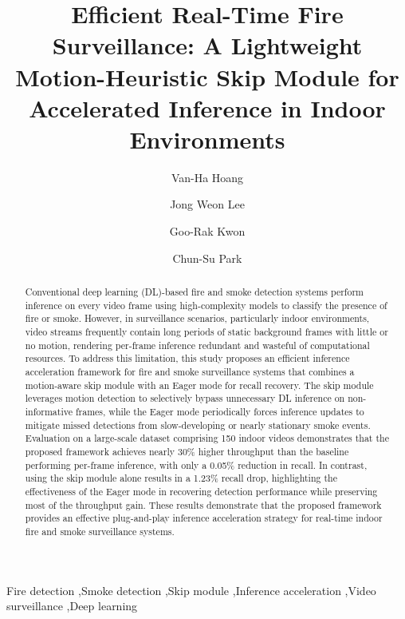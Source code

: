 \documentclass[final,3p,times,twocolumn]{elsarticle}
\begin{document}
\begin{frontmatter}

\title{Efficient Real-Time Fire Surveillance: A Lightweight
Motion-Heuristic Skip Module for Accelerated Inference in Indoor
Environments}

\author[1]{Van-Ha Hoang}

\author[1]{Jong Weon Lee}

\author[2]{Goo-Rak Kwon}

\author[3]{Chun-Su Park}

\address[1]{Department of Software, Sejong University, Seoul, 05006, South Korea}
\address[2]{Department of Information and Communication Engineering, Chosun University, Gwangju, 61452, South Korea}
\address[3]{Department of Computer Education, Sungkyunkwan University, Seoul, 03063, South Korea}


\begin{abstract}
Conventional deep learning (DL)-based fire and smoke detection systems
perform inference on every video frame using high-complexity models to
classify the presence of fire or smoke. However, in surveillance
scenarios, particularly indoor environments, video streams frequently
contain long periods of static background frames with little or no
motion, rendering per-frame inference redundant and wasteful of
computational resources. To address this limitation, this study proposes
an efficient inference acceleration framework for fire and smoke
surveillance systems that combines a motion-aware skip module with an
Eager mode for recall recovery. The skip module leverages motion
detection to selectively bypass unnecessary DL inference on
non-informative frames, while the Eager mode periodically forces
inference updates to mitigate missed detections from slow-developing or
nearly stationary smoke events. Evaluation on a large-scale dataset
comprising 150 indoor videos demonstrates that the proposed framework
achieves nearly 30\% higher throughput than the baseline performing
per-frame inference, with only a 0.05\% reduction in recall. In
contrast, using the skip module alone results in a 1.23\% recall drop,
highlighting the effectiveness of the Eager mode in recovering detection
performance while preserving most of the throughput gain. These results
demonstrate that the proposed framework provides an effective
plug-and-play inference acceleration strategy for real-time indoor fire
and smoke surveillance systems.
\end{abstract}

\begin{keyword}
Fire detection \sep Smoke detection \sep Skip module \sep Inference
acceleration \sep Video surveillance \sep Deep learning
\end{keyword}

\end{frontmatter}
\end{document}
